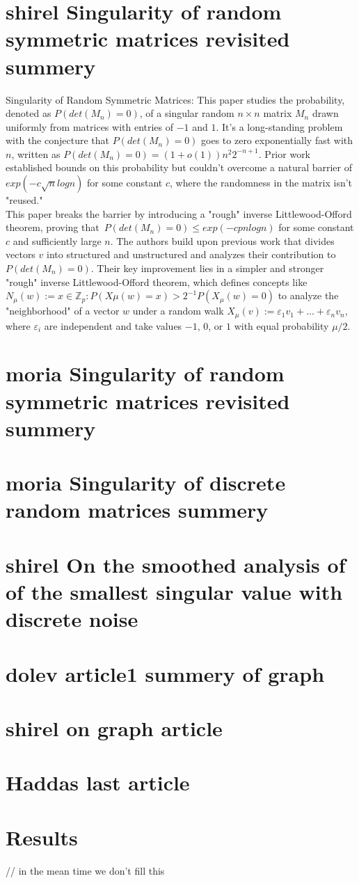 \documentclass[12pt]{article}
\begin{document}
\section{shirel Singularity of random symmetric matrices revisited summery}
\begin{flushleft}
Singularity of Random Symmetric Matrices: This paper studies the probability, denoted as ${P(det(M_n) = 0)}$, of a singular random ${n \times n}$ matrix ${M_n}$ drawn uniformly from matrices with entries of ${-1}$ and ${1}$. It's a long-standing problem with the conjecture that ${P(det(M_n) = 0)}$ goes to zero exponentially fast with ${n}$, written as ${P(det(M_n) = 0) = (1 + o(1))n^{2}2^{-n+1}}$. Prior work established bounds on this probability but couldn't overcome a natural barrier of ${exp(-c\sqrt{n} log n)}$ for some constant ${c}$, where the randomness in the matrix isn't "reused."\\
This paper breaks the barrier by introducing a "rough" inverse Littlewood-Offord theorem, proving that\ ${P(det(M_n) = 0) \leq exp(-cpn log n)}$ for some constant ${c}$ and sufficiently large ${n}$. The authors build upon previous work that divides vectors ${v}$ into structured and unstructured and analyzes their contribution to ${P(det(M_n) = 0)}$. Their key improvement lies in a simpler and stronger "rough" inverse Littlewood-Offord theorem, which defines concepts like ${N_{\mu}(w) := {x \in \mathbb{Z}_{p} : P(X \mu (w) = x) > 2^{-1}P(X_{\mu}(w) = 0)}}$ to analyze the "neighborhood" of a vector ${w}$ under a random walk ${X_{\mu}(v) := \varepsilon_1 v_1 + ... + \varepsilon_n v_n}$, where ${\varepsilon_i}$ are independent and take values ${-1}$, ${0}$, or ${1}$ with equal probability ${\mu /2}$.
\end{flushleft}

\section{moria Singularity of random symmetric matrices revisited summery}

\section{moria Singularity of discrete random matrices summery}

\section{shirel On the smoothed analysis of of the smallest singular value with discrete noise}

\section{dolev article1 summery of graph}

\section{shirel on graph article}

\section{Haddas last article}

\section{Results}
// in the mean time we don't fill this
\end{document}
